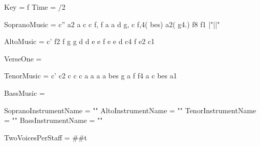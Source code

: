 
Key = \key f \major
Time = /2

SopranoMusic = \relative c'' { 
	a2 a c c f, f a a d g, c f,4( bes) a2( g4.) f8 f1 \bar "||"
}

AltoMusic = \relative c' { 
f2 f g g d d e e f e e d c4 f e2 c1 }

VerseOne = 

TenorMusic = \relative c' { 
	c2 c c c a a a a bes g a f f4 a c bes a1 }

BassMusic = 

SopranoInstrumentName = ""
AltoInstrumentName = ""
TenorInstrumentName = ""
BassInstrumentName = ""

TwoVoicesPerStaff = ##t
 
  


